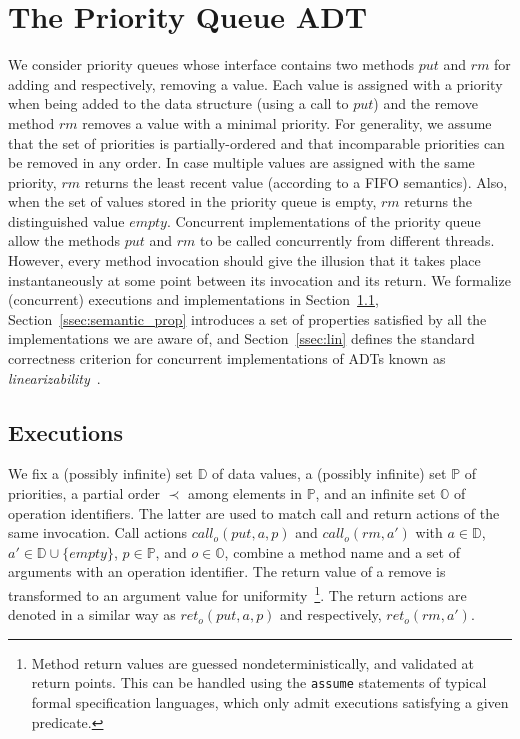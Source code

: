 \newcommand{\seqPQ}{\mathsf{SeqPQ}}

\section{The Priority Queue ADT}
\label{sec:priority queue and data-independence}

We consider priority queues whose interface contains two methods $\textit{put}$ and $\textit{rm}$ for adding and respectively, removing a value. Each value is assigned with a priority when being added to the data structure (using a call to  $\textit{put}$) and the remove method $\textit{rm}$ removes a value with a minimal priority. For generality, we assume that the set of priorities is partially-ordered and that incomparable priorities can be removed in any order. In case multiple values are assigned with the same priority, $\textit{rm}$ returns the least recent value (according to a FIFO semantics). Also, when the set of values stored in the priority queue is empty, $\textit{rm}$ returns the distinguished value $\textit{empty}$. Concurrent implementations of the priority queue allow the methods $\textit{put}$ and $\textit{rm}$ to be called concurrently from different threads. However, every method invocation should give the illusion that it takes place instantaneously at some point between its invocation and its return. We formalize (concurrent) executions and implementations in Section~\ref{ssec:exec}, Section~\ref{ssec:semantic_prop} introduces a set of properties satisfied by all the  implementations we are aware of, and Section~\ref{ssec:lin} defines the standard correctness criterion for concurrent implementations of ADTs known as \emph{linearizability}~\cite{journals/toplas/HerlihyW90}.

\subsection{Executions}\label{ssec:exec}

We fix a (possibly infinite) set $\mathbb{D}$ of data values, a (possibly infinite) set $\mathbb{P}$ of priorities, a partial order $\prec$ among elements in $\mathbb{P}$, and an infinite set $\mathbb{O}$ of operation identifiers.
The latter are used to match call and return actions of the same invocation. Call actions $\textit{call}_o(\textit{put},a,p)$ and $\textit{call}_o(\textit{rm},a')$ with $a\in \mathbb{D}$, $a'\in \mathbb{D}\cup\{\textit{empty}\}$, $p \in \mathbb{P}$, and $o \in \mathbb{O}$, combine a method name and a set of arguments with an operation identifier. The return value of a remove is transformed to an argument value for uniformity~\footnote{Method return values are guessed nondeterministically, and validated at return points.
This can be handled using the {\tt assume} statements of typical formal specification languages, which only admit executions satisfying a given predicate.}.
The return actions are denoted in a similar way as $\textit{ret}_o(\textit{put},a,p)$ and respectively, $\textit{ret}_o(\textit{rm},a')$.


